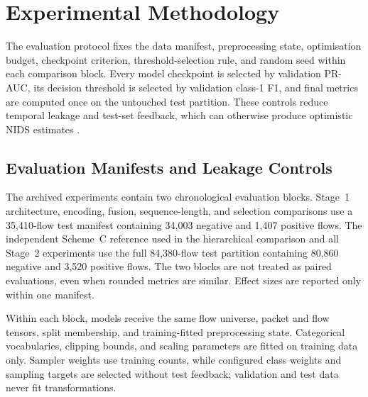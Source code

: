 \documentclass[11pt,fleqn]{report}
\begin{document}
\providecommand{\ExpPlatform}{Google Colaboratory Pro+}
\providecommand{\ExpComputeBudget}{600 purchased compute units}
\providecommand{\ExpGPU}{NVIDIA L4 (24~GB)}
\providecommand{\ExpCPU}{Google Colab hosted CPU; exact model not retained in the run metadata}
\providecommand{\ExpOS}{Google Colab hosted Linux runtime}
\providecommand{\ExpSoftware}{PyTorch and scikit-learn on CUDA; exact version snapshot not retained}
\providecommand{\ExpSuricata}{Suricata with the custom output module; exact version and revision not retained}

\chapter{Experimental Methodology}
\label{sec:experimental_methodology}

The evaluation protocol fixes the data manifest, preprocessing state, optimisation budget, checkpoint criterion, threshold-selection rule, and random seed within each comparison block. Every model checkpoint is selected by validation PR-AUC, its decision threshold is selected by validation class-1 F1, and final metrics are computed once on the untouched test partition. These controls reduce temporal leakage and test-set feedback, which can otherwise produce optimistic NIDS estimates \cite{SommerPaxson2010,Arp2022DosDonts}.

\section{Evaluation Manifests and Leakage Controls}
\label{subsec:experimental_data_protocol}

The archived experiments contain two chronological evaluation blocks. Stage~1 architecture, encoding, fusion, sequence-length, and selection comparisons use a 35,410-flow test manifest containing 34,003 negative and 1,407 positive flows. The independent Scheme~C reference used in the hierarchical comparison and all Stage~2 experiments use the full 84,380-flow test partition containing 80,860 negative and 3,520 positive flows. The two blocks are not treated as paired evaluations, even when rounded metrics are similar. Effect sizes are reported only within one manifest.

Within each block, models receive the same flow universe, packet and flow tensors, split membership, and training-fitted preprocessing state. Categorical vocabularies, clipping bounds, and scaling parameters are fitted on training data only. Sampler weights use training counts, while configured class weights and sampling targets are selected without test feedback; validation and test data never fit transformations.
\end{document}

